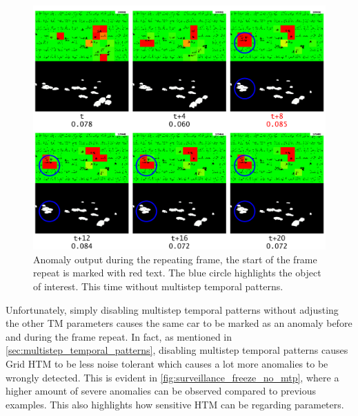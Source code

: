 \begin{figure}[H]
    \centering
    \includegraphics[width=\textwidth]{resources/experiments/surveillance/surveillance_freeze_no_mtp.png}
    \caption[Frame Repeat No MTP Anomaly]{Anomaly output during the repeating frame, the start of the frame repeat is marked with red text. The blue circle highlights the object of interest. This time without multistep temporal patterns.}
    \label{fig:surveillance_freeze_no_mtp}
\end{figure}
Unfortunately, simply disabling multistep temporal patterns without adjusting the other TM parameters causes the same car to be marked as an anomaly before and during the frame repeat. In fact, as mentioned in \autoref{sec:multistep_temporal_patterns}, disabling multistep temporal patterns causes Grid HTM to be less noise tolerant which causes a lot more anomalies to be wrongly detected. This is evident in \autoref{fig:surveillance_freeze_no_mtp}, where a higher amount of severe anomalies can be observed compared to previous examples. This also highlights how sensitive HTM can be regarding parameters.
